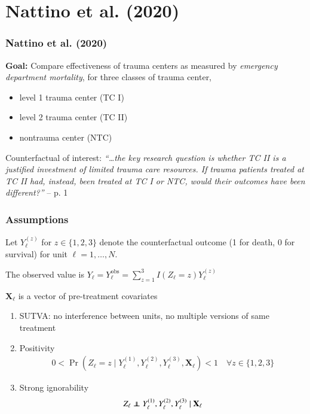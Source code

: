 
\section{Nattino et al. (2020)}



\begin{frame}
  \frametitle{Nattino et al. (2020)}
  
  \textbf{Goal:} Compare effectiveness of trauma centers as measured
  by \emph{emergency department mortality}, for three classes of
  trauma center, 
  \begin{itemize}
  \item level 1 trauma center (TC I) \medskip 
  \item level 2 trauma center (TC II) \medskip 
  \item nontrauma center (NTC) \medskip 
  \end{itemize}

  Counterfactual of interest: \footnotesize\textit{``\ldots the key
    research question is whether TC II is a justified investment of
    limited trauma care resources. If trauma patients treated at TC II
    had, instead, been treated at TC I or NTC, would their outcomes
    have been different?''} -- p. 1 \normalsize
  
\end{frame}


\begin{frame}
  \frametitle{Assumptions}

  Let $Y_\ell^{(z)}$ for $z \in \{1,2,3\}$ denote the counterfactual
  outcome (1 for death, 0 for survival) for unit $\ell=1,\ldots, N$.

  \medskip

  The observed value is
  $Y_\ell = Y^{\text{obs}}_\ell = \sum_{z=1}^{3} I(Z_\ell = z)
  Y_\ell^{(z)}$

  \medskip

  $\mathbf{X}_\ell$ is a vector of pre-treatment covariates  \medskip 

  \begin{enumerate}[1. ]
  \item SUTVA: no interference between units, no multiple versions of
    same treatment
  \item Positivity
    \begin{align*}
      0 < \Pr(Z_\ell = z \mid Y_\ell^{(1)}, Y_\ell^{(2)},
      Y_\ell^{(3)}, \mathbf{X}_\ell) < 1 \quad \forall z \in \{1,2,3\}
    \end{align*}
    \item
  Strong ignorability
  \begin{align*}
    Z_\ell \ind Y_\ell^{(1)}, Y_\ell^{(2)},
      Y_\ell^{(3)} \mid \mathbf{X}_\ell
  \end{align*}
  \end{enumerate}

\end{frame}

